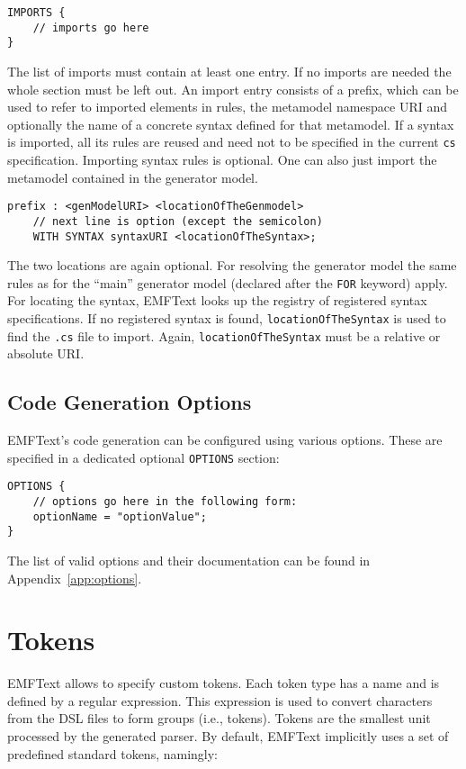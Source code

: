 \begin{lstlisting}
IMPORTS {
    // imports go here
}
\end{lstlisting}

The list of imports must contain at least one entry. If no imports are 
needed the whole section must be left out. An import entry consists of a prefix, 
which can be used to refer to imported elements in rules, the metamodel
namespace URI and optionally the name of a concrete syntax defined for that
metamodel. If a syntax is imported, all its rules are reused and need not to be
specified in the current \texttt{cs} specification. Importing syntax rules is
optional. One can also just import the metamodel contained in the generator model.

\begin{lstlisting}
prefix : <genModelURI> <locationOfTheGenmodel>
    // next line is option (except the semicolon) 
    WITH SYNTAX syntaxURI <locationOfTheSyntax>;
\end{lstlisting}

The two locations are again optional. For resolving the generator model the same
rules as for the ``main'' generator model (declared after the \texttt{FOR}
keyword) apply. For locating the syntax, EMFText looks up the registry of
registered syntax specifications. If no registered syntax is found, 
\texttt{locationOfTheSyntax} is used to find the \texttt{.cs} file to import.
Again, \texttt{locationOfTheSyntax} must be a relative or absolute URI.

\subsection{Code Generation Options}

EMFText's code generation can be configured using various options. These are
specified in a dedicated optional \texttt{OPTIONS} section:

\begin{lstlisting}
OPTIONS {
    // options go here in the following form:
    optionName = "optionValue";
}
\end{lstlisting}

The list of valid options and their documentation can be found in
Appendix~\ref{app:options}.

\section{Tokens}

EMFText allows to specify custom tokens. Each token type has a name and is
defined by a regular expression. This expression is used to convert characters 
from the DSL files to form groups (i.e., tokens). Tokens are the smallest unit
processed by the generated parser. By default, EMFText implicitly uses a set of
predefined standard tokens, namingly:


